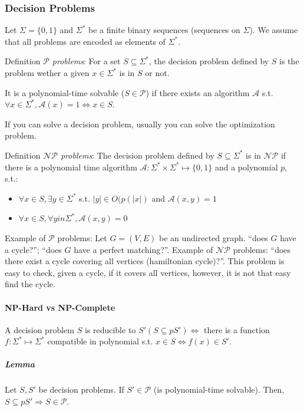 \documentclass[main]{subfiles}
\begin{document}
\subsubsection{Decision Problems}
Let $\Sigma = \{0,1\}$ and $\Sigma^{*}$ be a finite binary sequences (sequences
on $\Sigma$). We assume that all problems are encoded as elements of
$\Sigma^{*}$.

Definition \emph{$\mathcal{P}$ problems}: For a set $S \subseteq \Sigma^{*}$,
the decision problem defined by $S$ is the problem wether a given $x \in
\Sigma^{*}$ is in $S$ or not.

It is a polynomial-time solvable ($S \in \mathcal{P}$) if there exists an
algorithm $\mathcal{A}$ s.t. $\forall x \in \Sigma^{*}, \mathcal{A}(x) = 1 \iff
x \in S$.

If you can solve a decision problem, usually you can solve the optimization
problem.

Definition \emph{$\mathcal{NP}$ problems}: The decision problem defined by $S
\subseteq \Sigma^{*}$ is in $\mathcal{NP}$ if there is a polynomial time
algorithm $\mathcal{A}: \Sigma^{*} \times \Sigma^{*} \mapsto \{0,1\}$ and a
polynomial $p$, s.t.:
\begin{itemize}
\item $ \forall x \in S, \exists y \in \Sigma^{*}$ s.t. $|y| \in O(p(|x|)$ and
$\mathcal{A}(x,y) = 1$
\item $ \forall x \in S, \forall y in \Sigma^{*}, \mathcal{A}(x,y) = 0$
\end{itemize}

Example of $\mathcal{P}$ problems: Let $G=(V,E)$ be an undirected graph. ``does
$G$ have a cycle?''; ``does $G$ have a perfect matching?''.
Example of $\mathcal{NP}$ problems: ``does there exist a cycle covering all
vertices (hamiltonian cycle)?''. This problem is easy to check, given a cycle,
if it covers all vertices, however, it is not that easy find the cycle.

\paragraph{NP-Hard vs NP-Complete}
A decision problem $S$ is reducible to $S' (S \subseteq pS') \iff$ there is a
function $f: \Sigma^{*} \mapsto \Sigma^{*}$ compatible in polynomial s.t. $x
\in S \iff f(x) \in S'$.

\subparagraph{Lemma}
Let $S, S'$ be decision problems. If $S' \in \mathcal{P}$ (is polynomial-time
solvable). Then, $S \subseteq pS' \Rightarrow S \in \mathcal{P}$.
\end{document}
